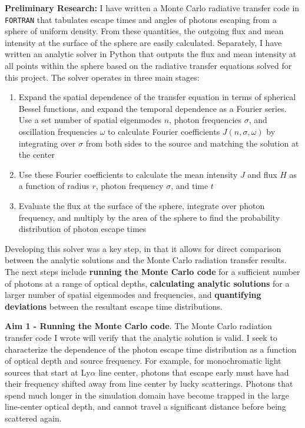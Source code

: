 \documentclass[11pt]{article}
\begin{document}
\textbf{Preliminary Research:} I have written a Monte Carlo radiative transfer code in \texttt{FORTRAN} that tabulates escape times and angles of photons escaping from a sphere of uniform density. From these quantities, the outgoing flux and mean intensity at the surface of the sphere are easily calculated. Separately, I have written an analytic solver in Python that outputs the flux and mean intensity at all points within the sphere based on the radiative transfer equations solved for this project. The solver operates in three main stages:
\begin{enumerate}[itemsep=-0.15cm, topsep=0cm]
    \item Expand the spatial dependence of the transfer equation in terms of spherical Bessel functions, and expand the temporal dependence as a Fourier series. Use a set number of spatial eigenmodes $n$, photon frequencies $\sigma$, and oscillation frequencies $\omega$ to calculate Fourier coefficients $J(n, \sigma, \omega)$ by integrating over $\sigma$ from both sides to the source and matching the solution at the center
    \item Use these Fourier coefficients to calculate the mean intensity $J$ and flux $H$ as a function of radius $r$, photon frequency $\sigma$, and time $t$
    \item Evaluate the flux at the surface of the sphere, integrate over photon frequency, and multiply by the area of the sphere to find the probability distribution of photon escape times
\end{enumerate}

Developing this solver was a key step, in that it allows for direct comparison between the analytic solutions and the Monte Carlo radiation transfer results. The next steps include \textbf{running the Monte Carlo code} for a sufficient number of photons at a range of optical depths, \textbf{calculating analytic solutions} for a larger number of spatial eigenmodes and frequencies, and \textbf{quantifying deviations} between the resultant escape time distributions.

\noindent \textbf{Aim 1 - Running the Monte Carlo code}. The Monte Carlo radiation transfer code I wrote will verify that the analytic solution is valid. I seek to characterize the dependence of the photon escape time distribution as a function of optical depth and source frequency. For example, for monochromatic light sources that start at Ly$\alpha$ line center, photons that escape early must have had their frequency shifted away from line center by lucky scatterings. Photons that spend much longer in the simulation domain have become trapped in the large line-center optical depth, and cannot travel a significant distance before being scattered again.
\end{document}
